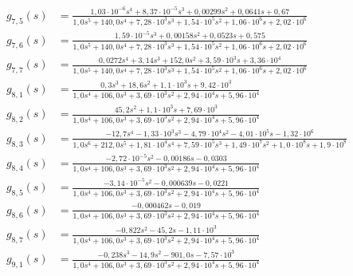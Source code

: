 \begin{landscape}
\begin{align}
    g_{7,5}(s) &= \frac{1{,}03 \cdot 10^{-6} s^{4} + 8{,}37 \cdot 10^{-5} s^{3} + 0{,}00299 s^{2} + 0{,}0641 s + 0{,}67}{1{,}0 s^{5} + 140{,}0 s^{4} + 7{,}28 \cdot 10^{3} s^{3} + 1{,}54 \cdot 10^{5} s^{2} + 1{,}06 \cdot 10^{6} s + 2{,}02 \cdot 10^{6}} \\
    g_{7,6}(s) &= \frac{1{,}59 \cdot 10^{-5} s^{3} + 0{,}00158 s^{2} + 0{,}0523 s + 0{,}575}{1{,}0 s^{5} + 140{,}0 s^{4} + 7{,}28 \cdot 10^{3} s^{3} + 1{,}54 \cdot 10^{5} s^{2} + 1{,}06 \cdot 10^{6} s + 2{,}02 \cdot 10^{6}} \\
    g_{7,7}(s) &= \frac{0{,}0272 s^{4} + 3{,}14 s^{3} + 152{,}0 s^{2} + 3{,}59 \cdot 10^{3} s + 3{,}36 \cdot 10^{4}}{1{,}0 s^{5} + 140{,}0 s^{4} + 7{,}28 \cdot 10^{3} s^{3} + 1{,}54 \cdot 10^{5} s^{2} + 1{,}06 \cdot 10^{6} s + 2{,}02 \cdot 10^{6}} \\
    g_{8,1}(s) &= \frac{0{,}3 s^{3} + 18{,}6 s^{2} + 1{,}1 \cdot 10^{3} s + 9{,}42 \cdot 10^{3}}{1{,}0 s^{4} + 106{,}0 s^{3} + 3{,}69 \cdot 10^{3} s^{2} + 2{,}94 \cdot 10^{4} s + 5{,}96 \cdot 10^{4}} \\
    g_{8,2}(s) &= \frac{45{,}2 s^{2} + 1{,}1 \cdot 10^{3} s + 7{,}69 \cdot 10^{3}}{1{,}0 s^{4} + 106{,}0 s^{3} + 3{,}69 \cdot 10^{3} s^{2} + 2{,}94 \cdot 10^{4} s + 5{,}96 \cdot 10^{4}} \\
    g_{8,3}(s) &= \frac{- 12{,}7 s^{4} - 1{,}33 \cdot 10^{3} s^{3} - 4{,}79 \cdot 10^{4} s^{2} - 4{,}01 \cdot 10^{5} s - 1{,}32 \cdot 10^{6}}{1{,}0 s^{6} + 212{,}0 s^{5} + 1{,}81 \cdot 10^{4} s^{4} + 7{,}59 \cdot 10^{5} s^{3} + 1{,}49 \cdot 10^{7} s^{2} + 1{,}0 \cdot 10^{8} s + 1{,}9 \cdot 10^{8}} \\
    g_{8,4}(s) &= \frac{- 2{,}72 \cdot 10^{-5} s^{2} - 0{,}00186 s - 0{,}0303}{1{,}0 s^{4} + 106{,}0 s^{3} + 3{,}69 \cdot 10^{3} s^{2} + 2{,}94 \cdot 10^{4} s + 5{,}96 \cdot 10^{4}} \\
    g_{8,5}(s) &= \frac{- 3{,}14 \cdot 10^{-5} s^{2} - 0{,}000639 s - 0{,}0221}{1{,}0 s^{4} + 106{,}0 s^{3} + 3{,}69 \cdot 10^{3} s^{2} + 2{,}94 \cdot 10^{4} s + 5{,}96 \cdot 10^{4}} \\
    g_{8,6}(s) &= \frac{- 0{,}000462 s - 0{,}019}{1{,}0 s^{4} + 106{,}0 s^{3} + 3{,}69 \cdot 10^{3} s^{2} + 2{,}94 \cdot 10^{4} s + 5{,}96 \cdot 10^{4}} \\
    g_{8,7}(s) &= \frac{- 0{,}822 s^{2} - 45{,}2 s - 1{,}11 \cdot 10^{3}}{1{,}0 s^{4} + 106{,}0 s^{3} + 3{,}69 \cdot 10^{3} s^{2} + 2{,}94 \cdot 10^{4} s + 5{,}96 \cdot 10^{4}} \\
    g_{9,1}(s) &= \frac{- 0{,}238 s^{3} - 14{,}9 s^{2} - 901{,}0 s - 7{,}57 \cdot 10^{3}}{1{,}0 s^{4} + 106{,}0 s^{3} + 3{,}69 \cdot 10^{3} s^{2} + 2{,}94 \cdot 10^{4} s + 5{,}96 \cdot 10^{4}} \\

\end{align}
\end{landscape}
